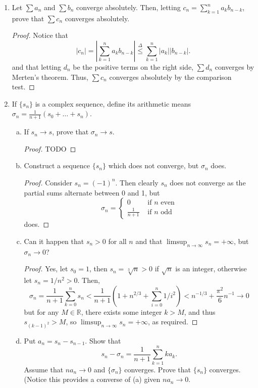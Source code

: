 \documentclass{scrbook}
\newcommand{\R}{\mathbb{R}}
\renewcommand{\to}{\rightarrow}
\begin{document}
\begin{enumerate}
\item %
Let $\sum a_n$ and $\sum b_n$ converge absolutely. Then, letting $c_n = \sum_{k=1}^{n} a_k b_{n-k}$, prove that $\sum c_n$ converges absolutely.

\begin{proof}
Notice that
\[
    |c_n| = \left| \sum_{k=1}^{n} a_k b_{n-k} \right| \overset{\Delta}{\le} \sum_{k=1}^{n} |a_k| |b_{n-k}|.    
\]
and that letting $d_n$ be the positive terms on the right side, $\sum d_n$ converges by Merten's theorem. Thus, $\sum c_n$ converges absolutely by the comparison test.
\end{proof}

\item %
If $\{s_n\}$ is a complex sequence, define its arithmetic means $\sigma_n = \frac{1}{n + 1} (s_0 + \dotsc + s_n)$. 
\begin{enumerate}[(a)]
\item If $s_n \to s$, prove that $\sigma_n \to s$.

\begin{proof}
TODO
\end{proof}

\item Construct a sequence $\{s_n\}$ which does not converge, but $\sigma_n$ does. 

\begin{proof}
Consider $s_n = (-1)^{n}$. Then clearly $s_n$ does not converge as the partial sums alternate between 0 and 1, but
\[
    \sigma_n = \begin{cases}
        0 & \text{ if $n$ even} \\
        \frac{1}{n + 1} & \text{ if $n$ odd}
    \end{cases}
\]
does.
\end{proof}
\item Can it happen that $s_n > 0$ for all $n$ and that $\limsup_{n \to \infty} s_n = +\infty$, but $\sigma_n \to 0$?

\begin{proof}
Yes, let $s_0 = 1$, then $s_n = \sqrt[3]{n} > 0$ if $\sqrt{n}$ is an integer, otherwise let $s_n = 1/n^2 > 0$. Then,
\[
    \sigma_n = \frac{1}{n + 1} \sum_{k=0}^{n} s_n < \frac{1}{n + 1} \left(1 + n^{2/3} + \sum_{i=0}^{n} 1/i^2 \right) < n^{-1/3} + \frac{\pi^2}{6}n^{-1} \to 0
\]
but for any $M \in \R$, there exists some integer $k > M$, and thus $s_{(k-1)^2} > M$, so $\limsup_{n \to \infty} s_n = +\infty$, as required.
\end{proof}
\item Put $a_n = s_n - s_{n-1}$. Show that
\[
	s_n - \sigma_n = \frac{1}{n + 1} \sum_{k=1}^{n} ka_k.
\]
Assume that $na_n \to 0$ and $\{\sigma_n\}$ converges. Prove that $\{s_n\}$ converges. (Notice this provides a converse of (a) given $na_n \to 0$.


\end{enumerate}
\end{enumerate}
\end{document}
